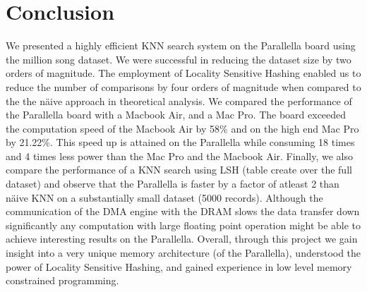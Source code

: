 \section{Conclusion}
\label{sec:conclusion}
We presented a highly efficient KNN search system on the Parallella board using the million song dataset. 
We were successful in reducing the dataset size by two orders of magnitude. 
The employment of Locality Sensitive Hashing enabled us to reduce the number of comparisons by four orders of magnitude when compared to the the n\"{a}ive approach in theoretical analysis.
We compared the performance of the Parallella board with a Macbook Air, and a Mac Pro. The board exceeded the computation speed of the Macbook Air by 58\% and on the high end Mac Pro by 21.22\%. This speed up is attained on the Parallella while consuming 18 times and 4 times less power than the Mac Pro and the Macbook Air. Finally, we also compare the performance of a KNN search using LSH (table create over the full dataset) and observe that the Parallella is faster by a factor of atleast 2 than n\"{a}ive KNN on a substantially small dataset (5000 records). Although the communication of the DMA engine with the DRAM slows the data transfer down significantly any computation with large floating point operation might be able to achieve interesting results on the Parallella. Overall, through this project we gain insight into a very unique memory architecture (of the Parallella), understood the power of Locality Sensitive Hashing, and gained experience in low level memory constrained programming.